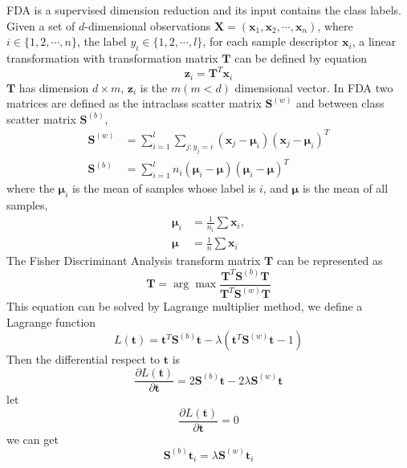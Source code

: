 FDA is a supervised dimension reduction and its input contains the class labels. Given a set of $d$-dimensional observations $\bm{X} = (\bm{x}_1, \bm{x}_2,\cdots,\bm{x}_n)$, where $i\in\{1,2,\cdots,n\}$, the label $y_i\in\{1,2,\cdots,l\}$, for each sample descriptor $\bm{x}_i$, a linear transformation with transformation matrix $\bm{T}$ can be defined by equation
\begin{equation}
\bm{z}_i = \bm{T}^T\bm{x}_i
\end{equation}
$\bm{T}$ has dimension $d\times m$, $\bm{z}_i$ is the $m(m<d)$ dimensional vector. In FDA two matrices are defined as the intraclass scatter matrix $\bm{S}^{(w)}$ and between class scatter matrix
$\bm{S}^{(b)}$, 
\begin{equation}
\begin{aligned}
\bm{S}^{(w)} &= \mathop{\sum} _{i=1}^l\mathop{\sum}_{j:y_j = i} (\bm{x}_j - \bm{\mu}_i)(\bm{x}_j - \bm{\mu}_i)^T \\
\bm{S}^{(b)}  &= \mathop{\sum} _{i=1}^l n_i(\bm{\mu}_i - \bm{\mu})(\bm{\mu}_i - \bm{\mu})^T
\end{aligned}
\end{equation}
where the $\bm{\mu}_i$ is the mean of samples whose label is $i$, and $\bm{\mu}$ is the mean of all samples,
\begin{equation}
\begin{aligned}
\bm{\mu}_i &= \frac{1}{n_i} \sum \bm{x}_i, \\
\bm{\mu} &= \frac{1}{n} \sum \bm{x}_i
\end{aligned}
\end{equation}
The Fisher Discriminant Analysis transform matrix $\bm{T}$ can be represented as 
\begin{equation}
\bm{T} = \arg\max \frac{\bm{T}^T\bm{S}^{(b)}\bm{T}}{\bm{T}^T\bm{S}^{(w)}\bm{T}}
\end{equation}
This equation can be solved by Lagrange multiplier method, we define a Lagrange function 
\begin{equation}
L(\bm{t}) = \bm{t}^T\bm{S}^{(b)}\bm{t} - \lambda(\bm{t}^T\bm{S}^{(w)}\bm{t} - 1)
\end{equation}
Then the differential respect to $\bm{t}$ is 
\begin{equation}
\frac{\partial L(\bm{t})}{\partial \bm{t}} = 2\bm{S}^{(b)}\bm{t} - 2\lambda \bm{S}^{(w)}\bm{t}
\end{equation}
let 
\begin{equation}
\frac{\partial L(\bm{t})}{\partial \bm{t}} = 0
\end{equation}
we can get 
\begin{equation}\label{eigen1}
\bm{S}^{(b)}\bm{t}_i  = \lambda \bm{S}^{(w)}\bm{t}_i
\end{equation}


